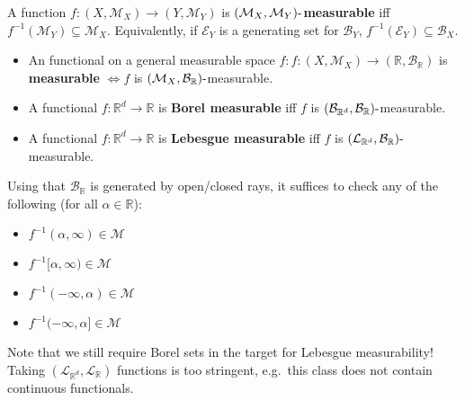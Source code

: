 \begin{definition}

A function \(f: (X, {\mathcal{M}}_X) \to (Y, {\mathcal{M}}_Y)\) is
\textbf{\(({\mathcal{M}}_X, {\mathcal{M}}_Y){\hbox{-}}\)measurable} iff
\(f^{-1}({\mathcal{M}}_Y) \subseteq {\mathcal{M}}_X\). Equivalently, if
\({\mathcal{E}}_Y\) is a generating set for \({\mathcal{B}}_Y\),
\(f^{-1}({\mathcal{E}}_Y) \subseteq {\mathcal{B}}_X\).

\begin{itemize}
\tightlist
\item
  An functional on a general measurable space
  \(f: f:(X, {\mathcal{M}}_X) \to ({\mathbb{R}}, {\mathcal{B}}_{\mathbb{R}})\)
  is \textbf{measurable} \(\iff f\) is
  \(({\mathcal{M}}_X, {\mathcal{B}}_{\mathbb{R}}){\hbox{-}}\)measurable.
\item
  A functional \(f: {\mathbb{R}}^d\to {\mathbb{R}}\) is \textbf{Borel
  measurable} iff \(f\) is
  \(({\mathcal{B}}_{{\mathbb{R}}^d}, {\mathcal{B}}_{\mathbb{R}}){\hbox{-}}\)measurable.
\item
  A functional \(f: {\mathbb{R}}^d\to {\mathbb{R}}\) is \textbf{Lebesgue
  measurable} iff \(f\) is
  \(({\mathcal{L}}_{{\mathbb{R}}^d}, {\mathcal{B}}_{\mathbb{R}}){\hbox{-}}\)measurable.
\end{itemize}

Using that \({\mathcal{B}}_{{\mathbb{R}}}\) is generated by open/closed
rays, it suffices to check any of the following (for all
\(\alpha \in {\mathbb{R}}\)):

\begin{itemize}
\tightlist
\item
  \(f^{-1}(\alpha, \infty)\in {\mathcal{M}}\)
\item
  \(f^{-1}[\alpha, \infty)\in {\mathcal{M}}\)
\item
  \(f^{-1}(-\infty, \alpha)\in {\mathcal{M}}\)
\item
  \(f^{-1}(-\infty, \alpha]\in {\mathcal{M}}\)
\end{itemize}

\end{definition}

\begin{remark}

Note that we still require Borel sets in the target for Lebesgue
measurability! Taking
\(({\mathcal{L}}_{{\mathbb{R}}^d}, {\mathcal{L}}_{\mathbb{R}})\)
functions is too stringent, e.g.~this class does not contain continuous
functionals.

\end{remark}

